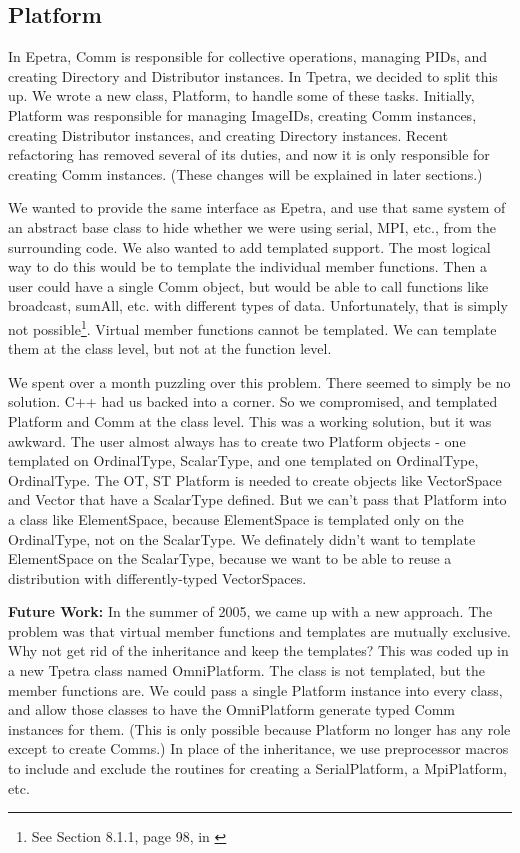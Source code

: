\documentclass[10pt,relax]{TpetraDesign}
\begin{document}
%
\subsection{Platform}
In Epetra, Comm is responsible for collective operations, managing PIDs, and creating Directory and Distributor instances. In Tpetra, we decided to split this up. We wrote a new class, Platform, to handle some of these tasks. Initially, Platform was responsible for managing ImageIDs, creating Comm instances, creating Distributor instances, and creating Directory instances. Recent refactoring has removed several of its duties, and now it is only responsible for creating Comm instances. (These changes will be explained in later sections.)

We wanted to provide the same interface as Epetra, and use that same system of an abstract base class to hide whether we were using serial, MPI, etc., from the surrounding code. We also wanted to add templated support. The most logical way to do this would be to template the individual member functions. Then a user could have a single Comm object, but would be able to call functions like broadcast, sumAll, etc. with different types of data. Unfortunately, that is simply not possible\footnote{See Section 8.1.1, page 98, in \cite{Templates-Complete-Guide}}. Virtual member functions cannot be templated. We can template them at the class level, but not at the function level.

We spent over a month puzzling over this problem. There seemed to simply be no solution. C++ had us backed into a corner. So we compromised, and templated Platform and Comm at the class level. This was a working solution, but it was awkward. The user almost always has to create two Platform objects - one templated on OrdinalType, ScalarType, and one templated on OrdinalType, OrdinalType. The OT, ST Platform is needed to create objects like VectorSpace and Vector that have a ScalarType defined. But we can't pass that Platform into a class like ElementSpace, because ElementSpace is templated only on the OrdinalType, not on the ScalarType. We definately didn't want to template ElementSpace on the ScalarType, because we want to be able to reuse a distribution with differently-typed VectorSpaces.

\textbf{Future Work:} In the summer of 2005, we came up with a new approach. The problem was that virtual member functions and templates are mutually exclusive. Why not get rid of the inheritance and keep the templates? This was coded up in a new Tpetra class named OmniPlatform. The class is not templated, but the member functions are. We could pass a single Platform instance into every class, and allow those classes to have the OmniPlatform generate typed Comm instances for them. (This is only possible because Platform no longer has any role except to create Comms.) In place of the inheritance, we use preprocessor macros to include and exclude the routines for creating a SerialPlatform, a MpiPlatform, etc. 
\end{document}
